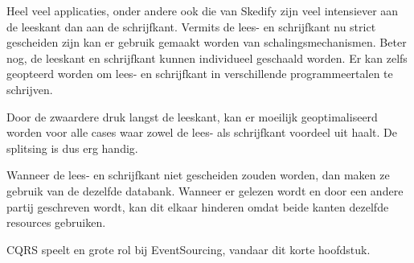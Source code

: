 Heel veel applicaties, onder andere ook die van Skedify zijn veel intensiever aan de leeskant dan aan de schrijfkant. Vermits de lees- en schrijfkant nu strict gescheiden zijn kan er gebruik gemaakt worden van schalingsmechanismen. Beter nog, de leeskant en schrijfkant kunnen individueel geschaald worden. Er kan zelfs geopteerd worden om lees- en schrijfkant in verschillende programmeertalen te schrijven.

Door de zwaardere druk langst de leeskant, kan er moeilijk geoptimaliseerd worden voor alle cases waar zowel de lees- als schrijfkant voordeel uit haalt. De splitsing is dus erg handig.

Wanneer de lees- en schrijfkant niet gescheiden zouden worden, dan maken ze gebruik van de dezelfde databank. Wanneer er gelezen wordt en door een andere partij geschreven wordt, kan dit elkaar hinderen omdat beide kanten dezelfde resources gebruiken.

CQRS speelt en grote rol bij EventSourcing, vandaar dit korte hoofdstuk.